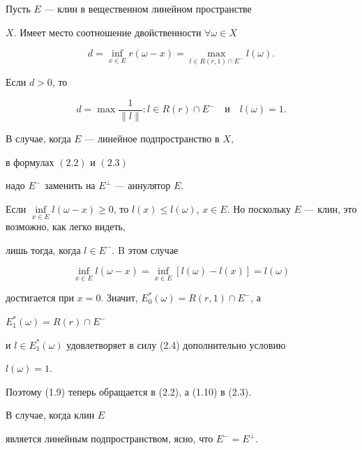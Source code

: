 


\begin{thms} 


Пусть $E$ --- клин в вещественном линейном пространстве 


$X$. Имеет место соотношение двойственности $\forall\omega\in X$ 


\begin{equation} 


d=\inf_{x\in E}r(\omega-x)= 


\max_{l\in R(r,1)\cap E^-}l(\omega). 


\end{equation} 


Если $d>0$, то 


\begin{equation} 


d=\max\frac{1}{\|l\|}:l\in R(r)\cap E^-\quad 


\text{и} \quad l(\omega)=1. 


\end{equation} 


В случае, когда $E$ --- линейное подпространство в $X$, 


в формулах $(2.2)$ и $(2.3)$ 


надо $E^-$ заменить на $E^\bot$ --- аннулятор $E$. 


\end{thms} 


 


\begin{pf} 


Если $\inf\limits_{x\in E}l(\omega-x)\ge0$, то $l(x)\le l(\omega)$, $x\in 


E$. Но поскольку $E$ --- клин, это возможно, как легко видеть, 


лишь тогда, когда $l\in E^-$. B этом случае 


\begin{equation} 


\inf_{x\in E}l(\omega-x)=\inf_{x\in E}[l(\omega)-l(x)]=l(\omega) 


\end{equation} 


достигается при $x=0$. Значит, $E^*_0(\omega)=R(r,1)\cap E^-$, а 


$E^*_1(\omega)=R(r)\cap E^-$ 


и $l\in E^*_1(\omega)$ удовлетворяет в силу (2.4) дополнительно условию 


$l(\omega)=1$. 


Поэтому (1.9) теперь обращается в (2.2), а (1.10) в (2.3). 


В случае, когда клин $E$ 


является линейным подпространством, ясно, что $E^-=E^\bot$.


\end{pf} 


